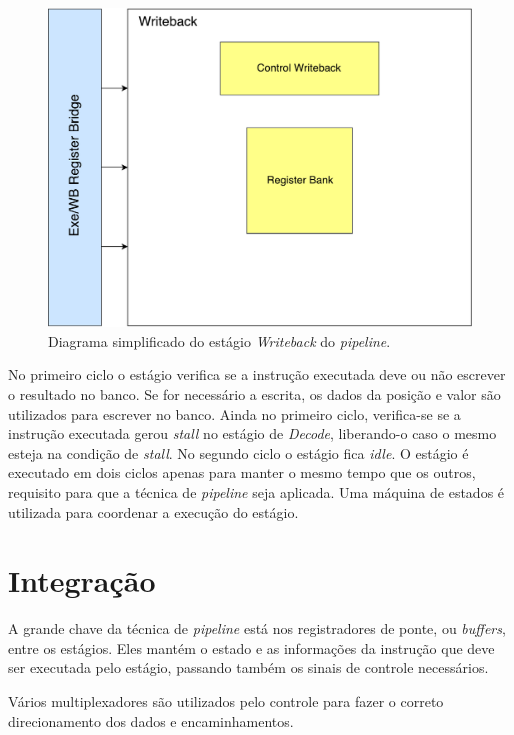 \documentclass[11pt,a4paper,titlepage]{article}
\begin{document}
\begin{figure}[!h]
\centering
\includegraphics[scale=0.4]{images/writebackpipe.pdf}
\caption{Diagrama simplificado do estágio \textit{Writeback} do \textit{pipeline}.}
\label{fig:writebackpipe}
\end{figure}

No primeiro ciclo o estágio verifica se a instrução executada deve ou não escrever o resultado no banco. Se for necessário a escrita, os dados da posição e valor são utilizados para escrever no banco. Ainda no primeiro ciclo, verifica-se se a instrução executada gerou \textit{stall} no estágio de \textit{Decode}, liberando-o caso o mesmo esteja na condição de \textit{stall}. No segundo ciclo o estágio fica \textit{idle}. O estágio é executado em dois ciclos apenas para manter o mesmo tempo que os outros, requisito para que a técnica de \textit{pipeline} seja aplicada. Uma máquina de estados é utilizada para coordenar a execução do estágio.

\section{Integração}

A grande chave da técnica de \textit{pipeline} está nos registradores de ponte, ou \textit{buffers}, entre os estágios. Eles mantém o estado e as informações da instrução que deve ser executada pelo estágio, passando também os sinais de controle necessários.

Vários multiplexadores são utilizados pelo controle para fazer o correto direcionamento dos dados e encaminhamentos.
\end{document}
